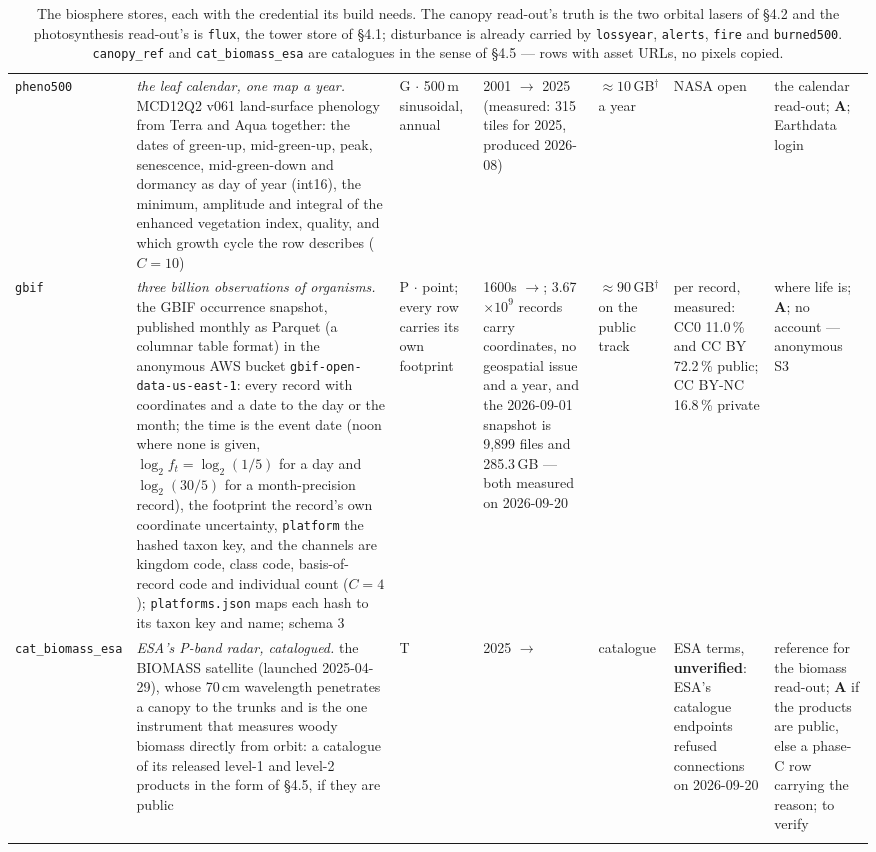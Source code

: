 \documentclass[10pt]{article}
\newcommand{\code}[1]{\texttt{#1}}
\begin{document}
{\begin{longtable}{@{}L{1.3cm}L{4.55cm}L{1.95cm}L{2.45cm}L{1.35cm}L{1.3cm}L{2.2cm}@{}}
\code{pheno500} & \emph{the leaf calendar, one map a year.} MCD12Q2 v061 land-surface phenology from Terra and Aqua together: the dates of green-up, mid-green-up, peak, senescence, mid-green-down and dormancy as day of year (int16), the minimum, amplitude and integral of the enhanced vegetation index, quality, and which growth cycle the row describes ($C = 10$) & G $\cdot$ 500\,m sinusoidal, annual & 2001 $\to$ 2025 (measured: 315 tiles for 2025, produced 2026-08) & $\approx 10$\,GB$^\dagger$ a year & NASA open & the calendar read-out; \textbf{A}; Earthdata login \\
\code{gbif} & \emph{three billion observations of organisms.} the GBIF occurrence snapshot, published monthly as Parquet (a columnar table format) in the anonymous AWS bucket \code{gbif-open-data-us-east-1}: every record with coordinates and a date to the day or the month; the time is the event date (noon where none is given, $\log_2 f_t = \log_2(1/5)$ for a day and $\log_2(30/5)$ for a month-precision record), the footprint the record's own coordinate uncertainty, \code{platform} the hashed taxon key, and the channels are kingdom code, class code, basis-of-record code and individual count ($C = 4$); \code{platforms.json} maps each hash to its taxon key and name; schema 3 & P $\cdot$ point; every row carries its own footprint & 1600s $\to$; 3.67 $\times 10^9$ records carry coordinates, no geospatial issue and a year, and the 2026-09-01 snapshot is 9,899 files and 285.3\,GB --- both measured on 2026-09-20 & $\approx 90$\,GB$^\dagger$ on the public track & per record, measured: CC0 11.0\,\% and CC BY 72.2\,\% public; CC BY-NC 16.8\,\% private & where life is; \textbf{A}; no account --- anonymous S3 \\
\code{cat\_\allowbreak biomass\_\allowbreak esa} & \emph{ESA's P-band radar, catalogued.} the BIOMASS satellite (launched 2025-04-29), whose 70\,cm wavelength penetrates a canopy to the trunks and is the one instrument that measures woody biomass directly from orbit: a catalogue of its released level-1 and level-2 products in the form of \S4.5, if they are public & T & 2025 $\to$ & catalogue & ESA terms, \textbf{unverified}: ESA's catalogue endpoints refused connections on 2026-09-20 & reference for the biomass read-out; \textbf{A} if the products are public, else a phase-C row carrying the reason; to verify \\
\bottomrule
\caption{The biosphere stores, each with the credential its build needs. The
canopy read-out's truth is the two orbital lasers of \S4.2 and the
photosynthesis read-out's is \code{flux}, the tower store of \S4.1;
disturbance is already carried by \code{lossyear}, \code{alerts},
\code{fire} and \code{burned500}. \code{canopy\_ref} and
\code{cat\_biomass\_esa} are catalogues in the sense of \S4.5 --- rows with
asset URLs, no pixels copied.}
\end{longtable}}
\end{document}
